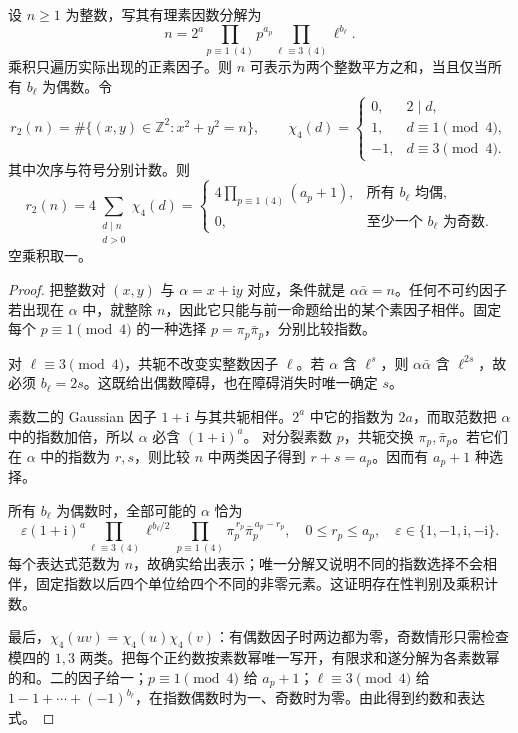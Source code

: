 \begin{theorem}[二平方和]\label{b3:thm:24-two-squares}
设 \(n\ge1\) 为整数，写其有理素因数分解为
\[
n=2^a\prod_{p\equiv1\ (4)}p^{a_p}
       \prod_{\ell\equiv3\ (4)}\ell^{b_\ell}.
\]
乘积只遍历实际出现的正素因子。则 \(n\) 可表示为两个整数平方之和，当且仅当所有 \(b_\ell\) 为偶数。令
\[
r_2(n)=\#\{(x,y)\in\mathbb Z^2:x^2+y^2=n\},\qquad
\chi_4(d)=
\begin{cases}
0,&2\mid d,\\
1,&d\equiv1\pmod4,\\
-1,&d\equiv3\pmod4.
\end{cases}
\]
其中次序与符号分别计数。则
\[
r_2(n)=4\sum_{\substack{d\mid n\\d>0}}\chi_4(d)
=\begin{cases}
4\displaystyle\prod_{p\equiv1\ (4)}(a_p+1),
  &\text{所有 }b_\ell\text{ 均偶},\\
0,&\text{至少一个 }b_\ell\text{ 为奇数}.
\end{cases}
\]
空乘积取一。
\end{theorem}
\begin{proof}
把整数对 \((x,y)\) 与 \(\alpha=x+\mathrm{i}y\) 对应，条件就是
\(\alpha\bar\alpha=n\)。任何不可约因子若出现在 \(\alpha\) 中，就整除 \(n\)，因此它只能与前一命题给出的某个素因子相伴。固定每个 \(p\equiv1\pmod4\) 的一种选择 \(p=\pi_p\bar\pi_p\)，分别比较指数。

对 \(\ell\equiv3\pmod4\)，共轭不改变实整数因子 \(\ell\)。若 \(\alpha\) 含 \(\ell^s\)，则 \(\alpha\bar\alpha\) 含 \(\ell^{2s}\)，故必须 \(b_\ell=2s\)。这既给出偶数障碍，也在障碍消失时唯一确定 \(s\)。

素数二的 Gaussian 因子 \(1+\mathrm{i}\) 与其共轭相伴。\(2^a\) 中它的指数为 \(2a\)，而取范数把 \(\alpha\) 中的指数加倍，所以 \(\alpha\) 必含 \((1+\mathrm{i})^a\)。
对分裂素数 \(p\)，共轭交换 \(\pi_p,\bar\pi_p\)。若它们在 \(\alpha\) 中的指数为 \(r,s\)，则比较 \(n\) 中两类因子得到
\(r+s=a_p\)。因而有 \(a_p+1\) 种选择。

所有 \(b_\ell\) 为偶数时，全部可能的 \(\alpha\) 恰为
\[
\varepsilon(1+\mathrm{i})^a
 \prod_{\ell\equiv3\ (4)}\ell^{b_\ell/2}
 \prod_{p\equiv1\ (4)}
       \pi_p^{\,r_p}\bar\pi_p^{\,a_p-r_p},
\quad
0\le r_p\le a_p,\quad
\varepsilon\in\{1,-1,\mathrm{i},-\mathrm{i}\}.
\]
每个表达式范数为 \(n\)，故确实给出表示；唯一分解又说明不同的指数选择不会相伴，固定指数以后四个单位给四个不同的非零元素。这证明存在性判别及乘积计数。

最后，\(\chi_4(uv)=\chi_4(u)\chi_4(v)\)：有偶数因子时两边都为零，奇数情形只需检查模四的 \(1,3\) 两类。把每个正约数按素数幂唯一写开，有限求和遂分解为各素数幂的和。二的因子给一；\(p\equiv1\pmod4\) 给 \(a_p+1\)；\(\ell\equiv3\pmod4\) 给
\(1-1+\cdots+(-1)^{b_\ell}\)，在指数偶数时为一、奇数时为零。由此得到约数和表达式。
\end{proof}

